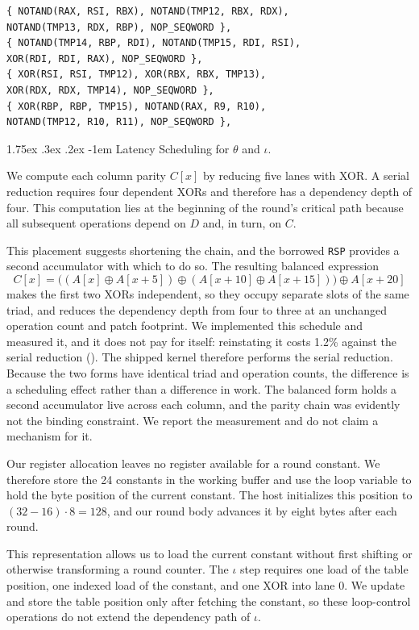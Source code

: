 \documentclass[journal=tches,submission]{iacrtrans}
\makeatletter
\newcommand{\code}[1]{\texttt{#1}}
\renewcommand\paragraph{\@startsection{paragraph}{4}{\z@}%
      {1.75ex \@plus .3ex \@minus .2ex}%
      {-1em}%
      {\normalfont\normalsize\bfseries\SS@parafont}}
\makeatother
\begin{document}
\begin{lstlisting}
{ NOTAND(RAX, RSI, RBX), NOTAND(TMP12, RBX, RDX),
NOTAND(TMP13, RDX, RBP), NOP_SEQWORD },
{ NOTAND(TMP14, RBP, RDI), NOTAND(TMP15, RDI, RSI),
XOR(RDI, RDI, RAX), NOP_SEQWORD },
{ XOR(RSI, RSI, TMP12), XOR(RBX, RBX, TMP13),
XOR(RDX, RDX, TMP14), NOP_SEQWORD },
{ XOR(RBP, RBP, TMP15), NOTAND(RAX, R9, R10),
NOTAND(TMP12, R10, R11), NOP_SEQWORD },
\end{lstlisting}

\paragraph{Latency Scheduling for $\theta$ and $\iota$.}
\label{sec:paritytree}

We compute each column parity $C[x]$ by reducing five lanes with XOR. 
A serial reduction requires four dependent XORs and therefore has a dependency depth of four. 
This computation lies at the beginning of the round’s critical path because all subsequent operations depend on $D$ and, in turn, on $C$.

This placement suggests shortening the chain, and the borrowed \code{RSP} provides a second accumulator with which to do so.
The resulting balanced expression
\[
C[x]=\bigl((A[x]\oplus A[x+5])\oplus(A[x+10]\oplus A[x+15])\bigr)
\oplus A[x+20]
\]
makes the first two XORs independent, so they occupy separate slots of the same triad, and reduces the dependency depth from four to three at an unchanged operation count and patch footprint.
We implemented this schedule and measured it, and it does not pay for itself: reinstating it costs 1.2\% against the serial reduction ().
The shipped kernel therefore performs the serial reduction.
Because the two forms have identical triad and operation counts, the difference is a scheduling effect rather than a difference in work.
The balanced form holds a second accumulator live across each column, and the parity chain was evidently not the binding constraint.
We report the measurement and do not claim a mechanism for it.

Our register allocation leaves no register available for a round constant. 
We therefore store the 24 constants in the working buffer and use the loop variable to hold the byte position of the current constant. 
The host initializes this position to $(32-16)\cdot8=128$, and our round body advances it by eight bytes after each round.

This representation allows us to load the current constant without first shifting or otherwise transforming a round counter. 
The $\iota$ step requires one load of the table position, one indexed load of the constant, and one XOR into lane 0. 
We update and store the table position only after fetching the constant, so these loop-control operations do not extend the dependency path of $\iota$.
\end{document}
